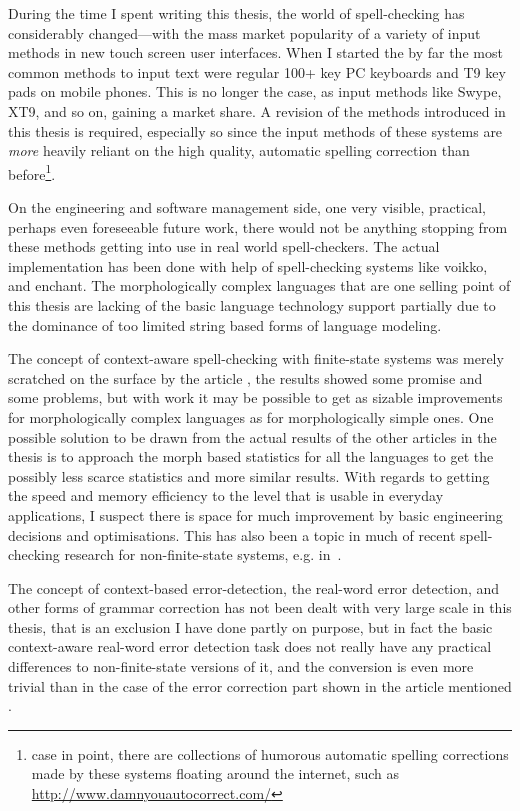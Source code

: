 \documentclass[officiallayout]{unihelcompling}
\begin{document}
During the time I spent writing this thesis, the world of spell-checking has
considerably changed---with the mass market popularity of a variety of input
methods in new touch screen user interfaces. When I started the by far the most
common methods to input text were regular 100+ key PC keyboards and T9 key pads
on mobile phones. This is no longer the case, as input methods like Swype, XT9,
and so on, gaining a market share. A revision of the methods introduced in this
thesis is required, especially so since the input methods of these systems are
\emph{more} heavily reliant on the high quality, automatic spelling correction
than before\footnote{case in point, there are collections of humorous automatic
    spelling corrections made by these systems floating around the internet,
such as \url{http://www.damnyouautocorrect.com/}}.

On the engineering and software management side, one very visible, practical,
perhaps even foreseeable future work, there would not be anything stopping from
these methods getting into use in real world spell-checkers. The actual
implementation has been done with help of spell-checking systems like voikko,
and enchant. The morphologically complex languages that are one selling point
of this thesis are lacking of the basic language technology support partially
due to the dominance of too limited string based forms of language modeling.

The concept of context-aware spell-checking with finite-state systems was
merely scratched on the surface by the article ,
the results showed some promise and some problems, but with work it may be
possible to get as sizable improvements for morphologically complex languages
as for morphologically simple ones. One possible solution to be drawn from
the actual results of the other articles in the thesis is to approach the
morph based statistics for all the languages to get the possibly less scarce
statistics and more similar results. With regards to getting the speed and
memory efficiency to the level that is usable in everyday applications, I
suspect there is space for much improvement by basic engineering decisions and
optimisations. This has also been a topic in much of recent spell-checking
research for non-finite-state systems, e.g. in~\citep{carlson2001scaling}.

The concept of context-based error-detection, the real-word error detection,
and other forms of grammar correction has not been dealt with very large scale
in this thesis, that is an exclusion I have done partly on purpose, but in
fact the basic context-aware real-word error detection task does not really
have any practical differences to non-finite-state versions of it, and the
conversion is even more trivial than in the case of the error correction part
shown in the article mentioned .



\end{document}
